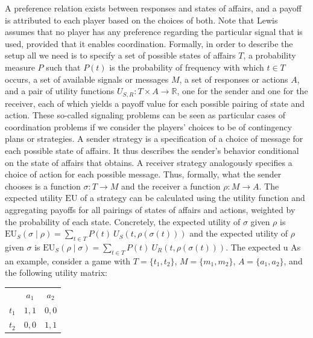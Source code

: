\documentclass[a4paper]{article}
\begin{document}
A preference relation exists between responses and states of affairs, and a payoff is attributed to each player based on the choices of both.
Note that Lewis assumes that no player has any preference regarding the particular signal that is used, provided that it enables coordination.
Formally, in order to describe the setup all we need is to specify a set of possible states of affairs $T$, a probability measure $P$ such that $P(t)$ is the probability of frequency with which $t \in T$ occurs, a set of available signals or messages $M$, a set of responses or actions $A$, and a pair of utility functions $U_{S,R} : T \times A \rightarrow \mathbb{R}$, one for the sender and one for the receiver, each of which yields a payoff value for each possible pairing of state and action.
These so-called signaling problems can be seen as particular cases of coordination problems if we consider the players' choices to be of contingency plans or strategies.
A sender strategy is a specification of a choice of message for each possible state of affairs.
It thus describes the sender's behavior conditional on the state of affairs that obtains.
A receiver strategy analogously specifies a choice of action for each possible message.
Thus, formally, what the sender chooses is a function $\sigma : T \rightarrow M$ and the receiver a function $\rho : M \rightarrow A$.
The expected utility $\text{EU}$ of a strategy can be calculated using the utility function and aggregating payoffs for all pairings of states of affairs and actions, weighted by the probability of each state. Concretely, the expected utility of $\sigma$ given $\rho$ is $\text{EU}_S(\sigma \mid \rho) = \sum_{t \in T} P(t) \ U_S(t, \rho(\sigma(t)))$ and the expected utility of $\rho$ given $\sigma$ is $\text{EU}_S(\rho \mid \sigma) = \sum_{t \in T} P(t) \ U_R(t, \rho(\sigma(t)))$.
The expected u %
As an example, consider a game with $T = \lbrace t_1, t_2 \rbrace$, $M = \lbrace m_1, m_2 \rbrace$, $A = \lbrace a_1, a_2 \rbrace$, and the following utility matrix:
\begin{center}
\begin{tabular}{r|c|c|}
\multicolumn{1}{r}{}
 & \multicolumn{1}{c}{$a_1$}
 & \multicolumn{1}{c}{$a_2$} \\ \cline{2-3}
   $t_1$ & $1,1$ & $0,0$ \\ \cline{2-3}
   $t_2$ & $0,0$ & $1,1$ \\ \cline{2-3}
\end{tabular}
\end{center}
\end{document}
